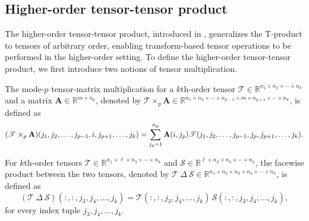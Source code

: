 \documentclass[onefignum,onetabnum]{siamart250211}
\begin{document}
\subsection{Higher-order tensor-tensor product} The higher-order tensor-tensor product, introduced in \cite{ozdemir2022high}, generalizes the T-product to tensors of arbitrary order,  enabling transform-based tensor operations to be performed in the higher-order setting. To define the higher-order tensor-tensor product, we first introduce two notions of tensor multiplication.

\begin{definition} 
    The mode-$p$ tensor-matrix multiplication for a $k$th-order tensor $\mathscr{T}\in\mathbb{R}^{n_1\times n_2\times \cdots \times n_k}$ and a matrix $\textbf{A}\in\mathbb{R}^{m\times n_p}$, denoted by $\mathscr{T}\times_p\textbf{A}\in\mathbb{R}^{n_1\times n_2\times \cdots \times n_{p-1}\times m\times n_{p+1}\times\cdots\times n_k}$, is defined as
\begin{equation*}
\scalebox{0.95}{$\displaystyle(\mathscr{T}\times_p \textbf{A}) (j_1,j_2,\dots, j_{p-1},i,j_{p+1},\dots, j_k) =
\sum_{j_p=1}^{n_p}
\textbf{A}(i, j_p)
\mathscr{T}(j_1,j_2,\dots, j_{p-1}, j_p, j_{p+1},\dots, j_k).$}
\end{equation*}
\end{definition}

\begin{definition} 
For $k$th-order tensors
$\mathscr{T}\in\mathbb{R}^{n_1\times \ell\times n_3\times \cdots\times n_k}$ and $\mathscr{S}\in\mathbb{R}^{\ell\times n_2\times n_3\times \cdots\times n_k}$, the facewise product between the two tensors, denoted by $\mathscr{T} \ \Delta \ \mathscr{S}\in\mathbb{R}^{n_1\times n_2\times n_3\times n_4\times \cdots\times n_k}$, is defined as
\begin{equation*}
({\mathscr{T}}\ \Delta\ {\mathscr{S}})(:,:,j_3, j_4,\dots, j_k)
=
{\mathscr{T}}(:,:,j_3,j_4, \dots, j_k)\,
{\mathscr{S}}(:,:,j_3,j_4, \dots, j_k),
\end{equation*}
for every index tuple $j_3,j_4,\dots,j_k$.
\end{definition}
\end{document}
